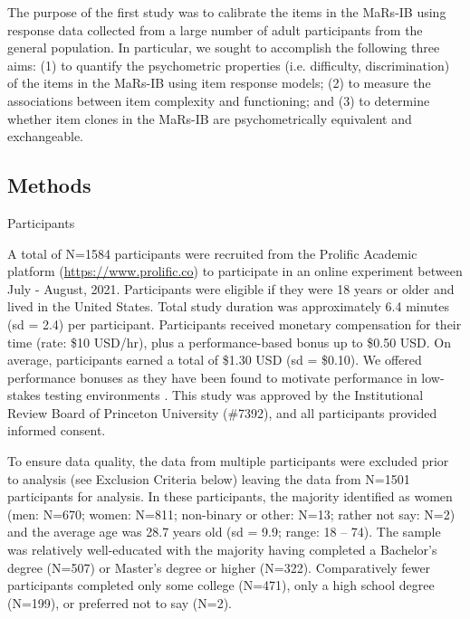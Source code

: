 \documentclass[a4paper,man,natbib,noextraspace]{apa6}
\makeatletter
\renewcommand{\subsubsection}{\@startsection{subsubsection}{3}
  {\z@}%
  {\b@level@two@skip}{\e@level@two@skip}%
  {\normalfont\normalsize\bfseries}}
\makeatother
\begin{document}
The purpose of the first study was to calibrate the items in the MaRs-IB using response data collected from a large number of adult participants from the general population. In particular, we sought to accomplish the following three aims: (1) to quantify the psychometric properties (i.e. difficulty, discrimination) of the items in the MaRs-IB using item response models; (2) to measure the associations between item complexity and functioning; and (3) to determine whether item clones in the MaRs-IB are psychometrically equivalent and exchangeable.

\subsection{Methods}

\subsubsection{Participants} 

A total of N=1584 participants were recruited from the Prolific Academic platform (\url{https://www.prolific.co}) to participate in an online experiment between July - August, 2021. Participants were eligible if they were 18 years or older and lived in the United States. Total study duration was approximately 6.4 minutes (sd = 2.4) per participant. Participants received monetary compensation for their time (rate: \$10 USD/hr), plus a performance-based bonus up to \$0.50 USD. On average, participants earned a total of \$1.30 USD (sd = \$0.10). We offered performance bonuses as they have been found to motivate performance in low-stakes testing environments \citep{duckworth2011role, gignac2018moderate}. This study was approved by the Institutional Review Board of Princeton University (\#7392), and all participants provided informed consent.

To ensure data quality, the data from multiple participants were excluded prior to analysis (see Exclusion Criteria below) leaving the data from N=1501 participants for analysis. In these participants, the majority identified as women (men: N=670; women: N=811; non-binary or other: N=13; rather not say: N=2) and the average age was 28.7 years old (sd = 9.9; range: 18 -- 74). The sample was relatively well-educated with the majority having completed a Bachelor's degree (N=507) or Master's degree or higher (N=322). Comparatively fewer participants completed only some college (N=471), only a high school degree (N=199), or preferred not to say (N=2). 
\end{document}
